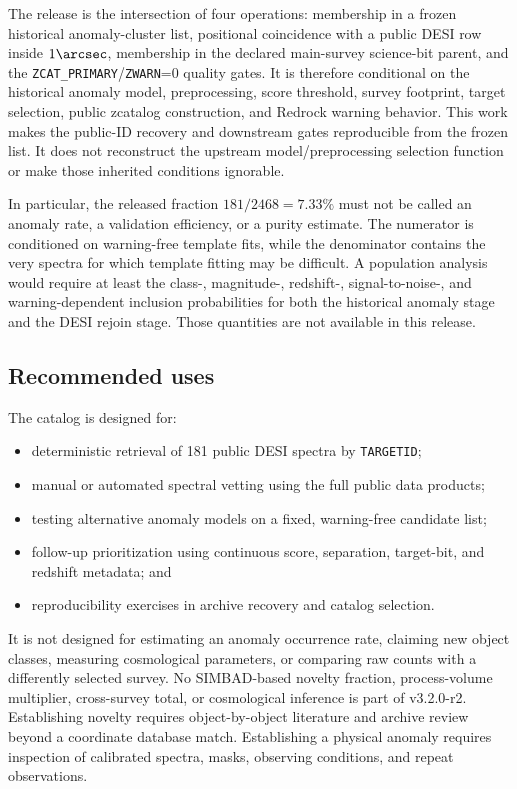 \documentclass[twocolumn]{aastex701}
\newcommand{\releaseVersion}{v3.2.0-r2}
\begin{document}
The release is the intersection of four operations: membership in a frozen historical
anomaly-cluster list, positional coincidence with a public DESI row inside $1\arcsec$, membership
in the declared main-survey science-bit parent, and the
\texttt{ZCAT\_PRIMARY}/\texttt{ZWARN}=0 quality gates.  It is therefore conditional on the
historical anomaly model, preprocessing, score threshold, survey footprint, target selection,
public zcatalog construction, and Redrock warning behavior.  This work makes the public-ID
recovery and downstream gates reproducible from the frozen list.  It does not reconstruct the
upstream model/preprocessing selection function or make those inherited conditions ignorable.

In particular, the released fraction $181/2468=7.33\%$ must not be called an anomaly rate, a
validation efficiency, or a purity estimate.  The numerator is conditioned on warning-free
template fits, while the denominator contains the very spectra for which template fitting may be
difficult.  A population analysis would require at least the class-, magnitude-, redshift-,
signal-to-noise-, and warning-dependent inclusion probabilities for both the historical anomaly
stage and the DESI rejoin stage.  Those quantities are not available in this release.

\subsection{Recommended uses}\label{sec:uses}

The catalog is designed for:
\begin{itemize}
\item deterministic retrieval of 181 public DESI spectra by \texttt{TARGETID};
\item manual or automated spectral vetting using the full public data products;
\item testing alternative anomaly models on a fixed, warning-free candidate list;
\item follow-up prioritization using continuous score, separation, target-bit, and redshift metadata; and
\item reproducibility exercises in archive recovery and catalog selection.
\end{itemize}

It is not designed for estimating an anomaly occurrence rate, claiming new object classes,
measuring cosmological parameters, or comparing raw counts with a differently selected survey.
No SIMBAD-based novelty fraction, process-volume multiplier, cross-survey total, or cosmological
inference is part of \releaseVersion{}.  Establishing novelty requires object-by-object literature and archive
review beyond a coordinate database match.  Establishing a physical anomaly requires inspection
of calibrated spectra, masks, observing conditions, and repeat observations.
\end{document}
